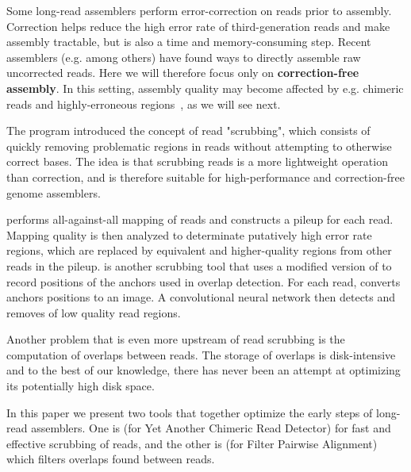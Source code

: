 \documentclass[./main.tex]{subfiles}
\begin{document}
Some long-read assemblers perform error-correction on reads prior to assembly. Correction helps reduce the high error rate of third-generation reads and make assembly tractable, %
but is also a time and memory-consuming step. Recent assemblers (e.g. \cite{minimap,wtdbg2} among others) have found ways to directly assemble raw uncorrected reads. Here we will therefore focus only on \textbf{correction-free assembly}. In this setting, assembly quality may become affected by e.g. chimeric reads and %
highly-erroneous regions~\citep{blog_post_error_repartition}, 
as we will see next.%

The \dascrubber program \citep{dascrubber} introduced the concept of read "scrubbing", which consists of quickly removing problematic regions in reads without attempting to otherwise correct bases.  The idea is that scrubbing reads is a more lightweight operation than correction, and is therefore suitable for high-performance and correction-free genome assemblers.

\dascrubber performs all-against-all mapping of reads and constructs a pileup for each read. Mapping quality is then analyzed to determinate putatively high error rate regions, which are replaced by equivalent and higher-quality regions from other reads in the pileup. 
\miniscrub\citep{miniscrub} is another scrubbing tool that uses a modified version of \minimap \citep{minimap2} to record positions of the anchors used in overlap detection. For each read, \miniscrub converts anchors positions to an image. A convolutional neural network then detects and removes of low quality read regions.

Another problem that is even more upstream of read scrubbing is the computation of overlaps between reads. The storage of overlaps is disk-intensive and to the best of our knowledge, there has never been an attempt at optimizing its potentially high disk space.

In this paper we present two tools that together optimize the early steps of long-read assemblers. One is \yacrd (for Yet Another Chimeric Read Detector) for fast and effective scrubbing of reads, and the other is \fpa (for Filter Pairwise Alignment) which filters overlaps found between reads. 


\end{document}
